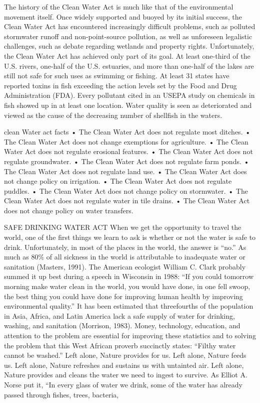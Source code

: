 \documentclass{article}
\begin{document}
The history of the Clean Water Act is much like that of the
environmental movement itself. Once widely supported and buoyed by its
initial success, the Clean Water Act has encountered increasingly
difficult problems, such as polluted stormwater runoff and
non-point-source pollution, as well as unforeseen legalistic challenges,
such as debate regarding wetlands and property rights. Unfortunately,
the Clean Water Act has achieved only part of its goal. At least
one-third of the U.S. rivers, one-half of the U.S. estuaries, and more
than one-half of the lakes are still not safe for such uses as swimming
or fishing. At least 31 states have reported toxins in fish exceeding
the action levels set by the Food and Drug Administration (FDA). Every
pollutant cited in an USEPA study on chemicals in fish showed up in at
least one location. Water quality is seen as deteriorated and viewed as
the cause of the decreasing number of shellfish in the waters.

clean Water act facts • The Clean Water Act does not regulate most
ditches. • The Clean Water Act does not change exemptions for
agriculture. • The Clean Water Act does not regulate erosional features.
• The Clean Water Act does not regulate groundwater. • The Clean Water
Act does not regulate farm ponds. • The Clean Water Act does not
regulate land use. • The Clean Water Act does not change policy on
irrigation. • The Clean Water Act does not regulate puddles. • The Clean
Water Act does not change policy on stormwater. • The Clean Water Act
does not regulate water in tile drains. • The Clean Water Act does not
change policy on water transfers.

SAFE DRINKING WATER ACT When we get the opportunity to travel the world,
one of the first things we learn to ask is whether or not the water is
safe to drink. Unfortunately, in most of the places in the world, the
answer is ``no.'' As much as 80\% of all sickness in the world is
attributable to inadequate water or sanitation (Masters, 1991). The
American ecologist William C. Clark probably summed it up best during a
speech in Wisconsin in 1988: ``If you could tomorrow morning make water
clean in the world, you would have done, in one fell swoop, the best
thing you could have done for improving human health by improving
environmental quality.'' It has been estimated that threefourths of the
population in Asia, Africa, and Latin America lack a safe supply of
water for drinking, washing, and sanitation (Morrison, 1983). Money,
technology, education, and attention to the problem are essential for
improving these statistics and to solving the problem that this West
African proverb succinctly states: ``Filthy water cannot be washed.''
Left alone, Nature provides for us. Left alone, Nature feeds us. Left
alone, Nature refreshes and sustains us with untainted air. Left alone,
Nature provides and cleans the water we need to ingest to survive. As
Elliot A. Norse put it, ``In every glass of water we drink, some of the
water has already passed through fishes, trees, bacteria,
\end{document}
